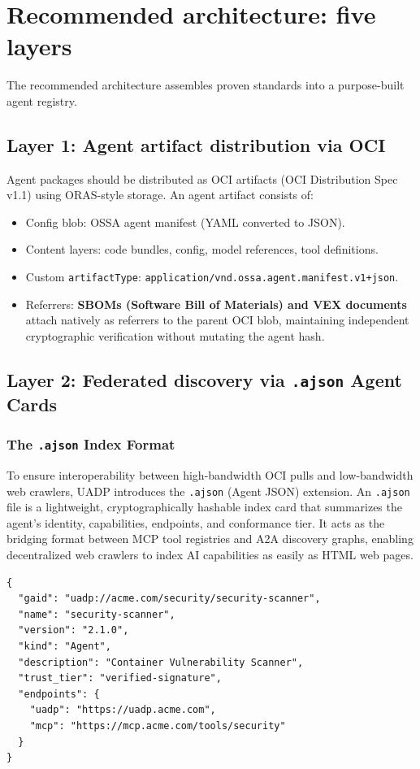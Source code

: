 \documentclass[11pt]{article}
\begin{document}
\section{Recommended architecture: five layers}
The recommended architecture assembles proven standards into a purpose-built agent registry.

\subsection{Layer 1: Agent artifact distribution via OCI}
Agent packages should be distributed as OCI artifacts (OCI Distribution Spec v1.1) using ORAS-style storage. An agent artifact consists of:
\begin{itemize}
  \item Config blob: OSSA agent manifest (YAML converted to JSON).
  \item Content layers: code bundles, config, model references, tool definitions.
  \item Custom \texttt{artifactType}: \texttt{application/vnd.ossa.agent.manifest.v1+json}.
  \item Referrers: \textbf{SBOMs (Software Bill of Materials) and VEX documents} attach natively as referrers to the parent OCI blob, maintaining independent cryptographic verification without mutating the agent hash.
\end{itemize}

\subsection{Layer 2: Federated discovery via \texttt{.ajson} Agent Cards}
\subsubsection{The \texttt{.ajson} Index Format}
To ensure interoperability between high-bandwidth OCI pulls and low-bandwidth web crawlers, UADP introduces the \texttt{.ajson} (Agent JSON) extension. An \texttt{.ajson} file is a lightweight, cryptographically hashable index card that summarizes the agent's identity, capabilities, endpoints, and conformance tier. It acts as the bridging format between MCP tool registries and A2A discovery graphs, enabling decentralized web crawlers to index AI capabilities as easily as HTML web pages.

\begin{lstlisting}
{
  "gaid": "uadp://acme.com/security/security-scanner",
  "name": "security-scanner",
  "version": "2.1.0",
  "kind": "Agent",
  "description": "Container Vulnerability Scanner",
  "trust_tier": "verified-signature",
  "endpoints": {
    "uadp": "https://uadp.acme.com",
    "mcp": "https://mcp.acme.com/tools/security"
  }
}
\end{lstlisting}
\end{document}
